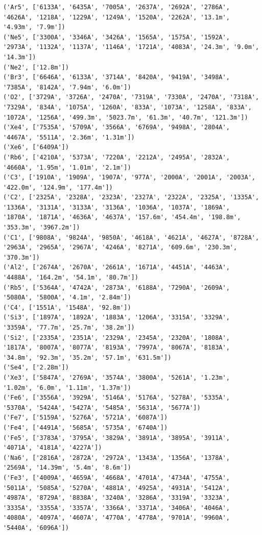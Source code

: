 \documentclass{report}
\begin{document}
\begin{Verbatim}[commandchars=\\\{\}]
('Ar5', ['6133A', '6435A', '7005A', '2637A', '2692A', '2786A', '4626A', '1218A', '1229A', '1249A', '1520A', '2262A', '13.1m', '4.93m', '7.9m'])
('Ne5', ['3300A', '3346A', '3426A', '1565A', '1575A', '1592A', '2973A', '1132A', '1137A', '1146A', '1721A', '4083A', '24.3m', '9.0m', '14.3m'])
('Ne2', ['12.8m'])
('Br3', ['6646A', '6133A', '3714A', '8420A', '9419A', '3498A', '7385A', '8142A', '7.94m', '6.0m'])
('O2', ['3729A', '3726A', '2470A', '7319A', '7330A', '2470A', '7318A', '7329A', '834A', '1075A', '1260A', '833A', '1073A', '1258A', '833A', '1072A', '1256A', '499.3m', '5023.7m', '61.3m', '40.7m', '121.3m'])
('Xe4', ['7535A', '5709A', '3566A', '6769A', '9498A', '2804A', '4467A', '5511A', '2.36m', '1.31m'])
('Xe6', ['6409A'])
('Rb6', ['4210A', '5373A', '7220A', '2212A', '2495A', '2832A', '4660A', '1.95m', '1.01m', '2.1m'])
('C3', ['1910A', '1909A', '1907A', '977A', '2000A', '2001A', '2003A', '422.0m', '124.9m', '177.4m'])
('C2', ['2325A', '2328A', '2323A', '2327A', '2322A', '2325A', '1335A', '1336A', '3131A', '3133A', '3136A', '1036A', '1037A', '1869A', '1870A', '1871A', '4636A', '4637A', '157.6m', '454.4m', '198.8m', '353.3m', '3967.2m'])
('C1', ['9808A', '9824A', '9850A', '4618A', '4621A', '4627A', '8728A', '2963A', '2965A', '2967A', '4246A', '8271A', '609.6m', '230.3m', '370.3m'])
('Al2', ['2674A', '2670A', '2661A', '1671A', '4451A', '4463A', '4488A', '164.2m', '54.1m', '80.7m'])
('Rb5', ['5364A', '4742A', '2873A', '6188A', '7290A', '2609A', '5080A', '5800A', '4.1m', '2.84m'])
('C4', ['1551A', '1548A', '92.8m'])
('Si3', ['1897A', '1892A', '1883A', '1206A', '3315A', '3329A', '3359A', '77.7m', '25.7m', '38.2m'])
('Si2', ['2335A', '2351A', '2329A', '2345A', '2320A', '1808A', '1817A', '8007A', '8077A', '8193A', '7997A', '8067A', '8183A', '34.8m', '92.3m', '35.2m', '57.1m', '631.5m'])
('Se4', ['2.28m'])
('Xe3', ['5847A', '2769A', '3574A', '3800A', '5261A', '1.23m', '1.02m', '6.0m', '1.11m', '1.37m'])
('Fe6', ['3556A', '3929A', '5146A', '5176A', '5278A', '5335A', '5370A', '5424A', '5427A', '5485A', '5631A', '5677A'])
('Fe7', ['5159A', '5276A', '5721A', '6087A'])
('Fe4', ['4491A', '5685A', '5735A', '6740A'])
('Fe5', ['3783A', '3795A', '3829A', '3891A', '3895A', '3911A', '4071A', '4181A', '4227A'])
('Na6', ['2816A', '2872A', '2972A', '1343A', '1356A', '1378A', '2569A', '14.39m', '5.4m', '8.6m'])
('Fe3', ['4009A', '4659A', '4668A', '4701A', '4734A', '4755A', '5011A', '5085A', '5270A', '4881A', '4925A', '4931A', '5412A', '4987A', '8729A', '8838A', '3240A', '3286A', '3319A', '3323A', '3335A', '3355A', '3357A', '3366A', '3371A', '3406A', '4046A', '4080A', '4097A', '4607A', '4770A', '4778A', '9701A', '9960A', '5440A', '6096A'])

\end{Verbatim}
\end{document}
